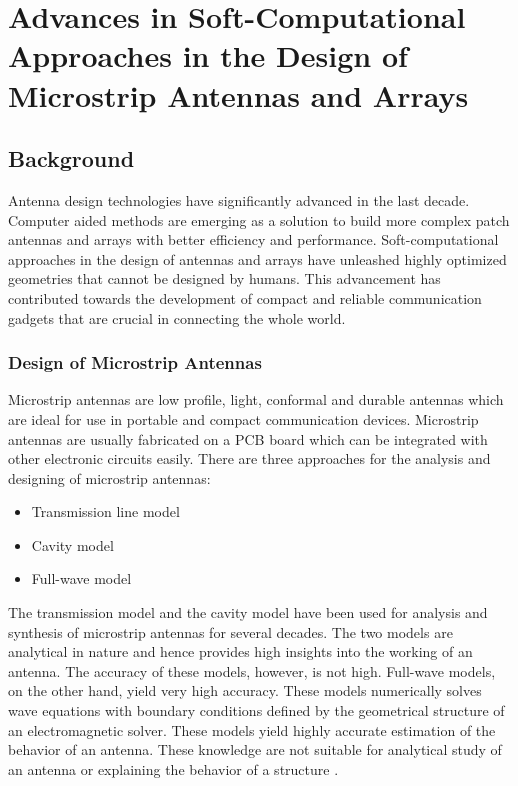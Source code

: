 \chapter{Advances in Soft-Computational Approaches in the Design of Microstrip Antennas and Arrays}
\label{chap:chap2}
\section{Background} \label{c2sec_background}
Antenna design technologies have significantly advanced in the last decade. Computer aided methods are emerging as a solution to build more complex patch antennas and arrays with better efficiency and performance. Soft-computational approaches in the design of antennas and arrays have unleashed highly optimized geometries that cannot be designed by humans. This advancement has contributed towards the development of compact and reliable communication gadgets that are crucial in connecting the whole world.

\subsection{Design of Microstrip Antennas}
Microstrip antennas are low profile, light, conformal and durable antennas which are ideal for use in portable and compact communication devices. Microstrip antennas are usually fabricated on a PCB board which can be integrated with other electronic circuits easily. There are three approaches for the analysis and designing of microstrip antennas:
\begin{itemize}
\item Transmission line model
\item Cavity model
\item Full-wave model
\end{itemize}

The transmission model and the cavity model have been used for analysis and synthesis of microstrip antennas for several decades. The two models are analytical in nature and hence provides high insights into the working of an antenna. The accuracy of these models, however, is not high. Full-wave models, on the other hand, yield very high accuracy. These models numerically solves wave equations with boundary conditions defined by the geometrical structure of an electromagnetic solver. These models yield highly accurate estimation of the behavior of an antenna. These knowledge are not suitable for analytical study of an antenna or explaining the behavior of a structure \cite{balanis}.

